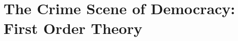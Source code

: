 \documentclass[11pt,a4paper,openright,oneside,titlepage]{book}
\begin{document}
		
 
		
		
	\part[The Crime Scene of Democracy]
	{The Crime Scene of Democracy: 
	First Order Theory}
	\label{part:democracy} 	
		
		 

		

		
		
	
		
		 

		
		
		
		
		
		
		

		

	
	
		\glsaddall
		\renewcommand*{\glspostdescription}{}
		\printglossaries
	
			
\end{document}
